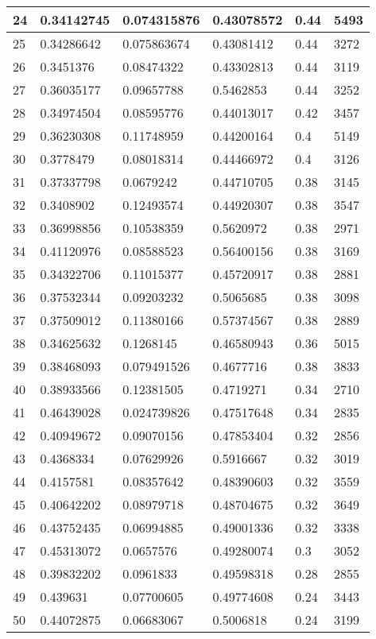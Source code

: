 \begin{longtable}{|l|l|l|l|l|l|}
24 & 0.34142745 & 0.074315876 & 0.43078572 & 0.44 & 5493 \\ \hline 
25 & 0.34286642 & 0.075863674 & 0.43081412 & 0.44 & 3272 \\ \hline 
26 & 0.3451376 & 0.08474322 & 0.43302813 & 0.44 & 3119 \\ \hline 
27 & 0.36035177 & 0.09657788 & 0.5462853 & 0.44 & 3252 \\ \hline 
28 & 0.34974504 & 0.08595776 & 0.44013017 & 0.42 & 3457 \\ \hline 
29 & 0.36230308 & 0.11748959 & 0.44200164 & 0.4 & 5149 \\ \hline 
30 & 0.3778479 & 0.08018314 & 0.44466972 & 0.4 & 3126 \\ \hline 
31 & 0.37337798 & 0.0679242 & 0.44710705 & 0.38 & 3145 \\ \hline 
32 & 0.3408902 & 0.12493574 & 0.44920307 & 0.38 & 3547 \\ \hline 
33 & 0.36998856 & 0.10538359 & 0.5620972 & 0.38 & 2971 \\ \hline 
34 & 0.41120976 & 0.08588523 & 0.56400156 & 0.38 & 3169 \\ \hline 
35 & 0.34322706 & 0.11015377 & 0.45720917 & 0.38 & 2881 \\ \hline 
36 & 0.37532344 & 0.09203232 & 0.5065685 & 0.38 & 3098 \\ \hline 
37 & 0.37509012 & 0.11380166 & 0.57374567 & 0.38 & 2889 \\ \hline 
38 & 0.34625632 & 0.1268145 & 0.46580943 & 0.36 & 5015 \\ \hline 
39 & 0.38468093 & 0.079491526 & 0.4677716 & 0.38 & 3833 \\ \hline 
40 & 0.38933566 & 0.12381505 & 0.4719271 & 0.34 & 2710 \\ \hline 
41 & 0.46439028 & 0.024739826 & 0.47517648 & 0.34 & 2835 \\ \hline 
42 & 0.40949672 & 0.09070156 & 0.47853404 & 0.32 & 2856 \\ \hline 
43 & 0.4368334 & 0.07629926 & 0.5916667 & 0.32 & 3019 \\ \hline 
44 & 0.4157581 & 0.08357642 & 0.48390603 & 0.32 & 3559 \\ \hline 
45 & 0.40642202 & 0.08979718 & 0.48704675 & 0.32 & 3649 \\ \hline 
46 & 0.43752435 & 0.06994885 & 0.49001336 & 0.32 & 3338 \\ \hline 
47 & 0.45313072 & 0.0657576 & 0.49280074 & 0.3 & 3052 \\ \hline 
48 & 0.39832202 & 0.0961833 & 0.49598318 & 0.28 & 2855 \\ \hline 
49 & 0.439631 & 0.07700605 & 0.49774608 & 0.24 & 3443 \\ \hline 
50 & 0.44072875 & 0.06683067 & 0.5006818 & 0.24 & 3199 \\ \hline 
\end{longtable}